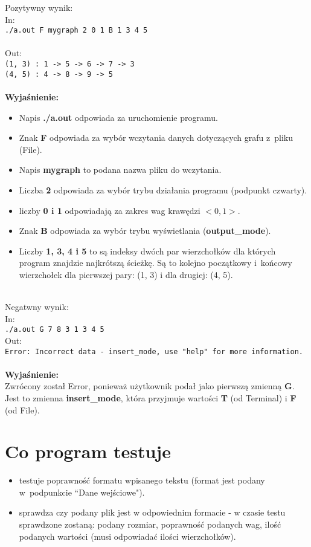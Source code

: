 \documentclass[12pt, a4paper]{article}
\begin{document}
Pozytywny wynik:\\
In: \\
\texttt{./a.out F mygraph 2 0 1 B 1 3 4 5}\\\\
Out:\\
\texttt{(1, 3) : 1 -> 5 -> 6 -> 7 -> 3}\\
\texttt{(4, 5) : 4 -> 8 -> 9 -> 5}
\\\\
\textbf{Wyjaśnienie:}
\begin{itemize}
    \item Napis \textbf{./a.out} odpowiada za uruchomienie programu.
    \item Znak \textbf{F} odpowiada za wybór wczytania danych dotyczących grafu z~pliku (File).
    \item Napis \textbf{mygraph} to podana nazwa pliku do wczytania.
    \item Liczba \textbf{2} odpowiada za wybór trybu działania programu (podpunkt czwarty).
    \item liczby \textbf{0 i 1} odpowiadają za zakres wag krawędzi $<0, 1>$.
    \item Znak \textbf{B} odpowiada za wybór trybu wyświetlania (\textbf{output\_mode}).
    \item Liczby \textbf{1, 3, 4 i 5} to są indeksy dwóch par wierzchołków dla których program znajdzie najkrótszą ścieżkę. Są to kolejno początkowy i~końcowy wierzchołek dla pierwszej pary: (1, 3) i dla drugiej: (4, 5).
\end{itemize}
\\

Negatwny wynik:\\ 
In:\\
\texttt{./a.out G 7 8 3 1 3 4 5}\\
Out:\\
\texttt{Error: Incorrect data - insert\_mode, use "help" for more information.}\\\\
\textbf{Wyjaśnienie:}\\
Zwrócony został Error, ponieważ użytkownik podał jako pierwszą zmienną \textbf{G}. Jest to zmienna \textbf{insert\_mode}, która przyjmuje wartości \textbf{T} (od Terminal) i \textbf{F} (od File). 


\section{Co program testuje}
\begin{itemize}
    \item testuje poprawność formatu wpisanego tekstu (format jest podany w~podpunkcie ``Dane wejściowe").
    \item sprawdza czy podany plik jest w odpowiednim formacie - w czasie testu sprawdzone zostaną: podany rozmiar, poprawność podanych wag, ilość podanych wartości (musi odpowiadać ilości wierzchołków).
\end{itemize}
\end{document}
